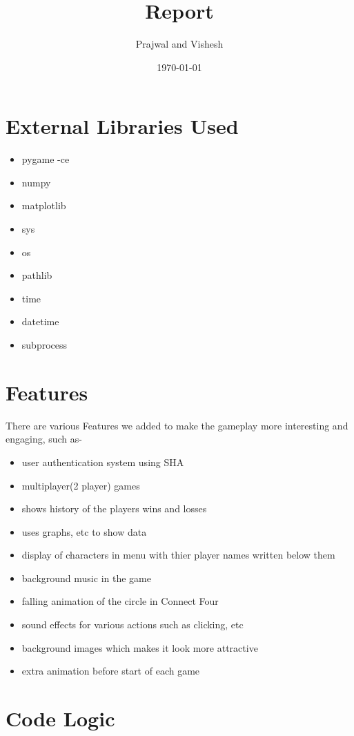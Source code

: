 \documentclass{article}
\title{Report}
\author{Prajwal and Vishesh}
\date{\today}
\begin{document}
\maketitle
\tableofcontents
\clearpage
\section{External Libraries Used}
\begin{itemize}
    \item pygame -ce
    \item numpy
    \item matplotlib
    \item sys
    \item os
    \item pathlib
    \item time
    \item datetime
    \item subprocess
\end{itemize}

\section{Features}

There are various Features we added to make the gameplay more interesting and engaging, such as-

\begin{itemize}
    

\item user authentication system using SHA
\item multiplayer(2 player) games
\item shows history of the players wins and losses
\item uses graphs, etc to show data
\item display of characters in menu with thier player names written below them
\item background music in the game
\item falling animation of the circle in Connect Four
\item sound effects for various actions such as clicking, etc
\item background images which makes it look more attractive
\item extra animation before start of each game

\end{itemize}
\clearpage

\section{Code Logic}
\end{document}
